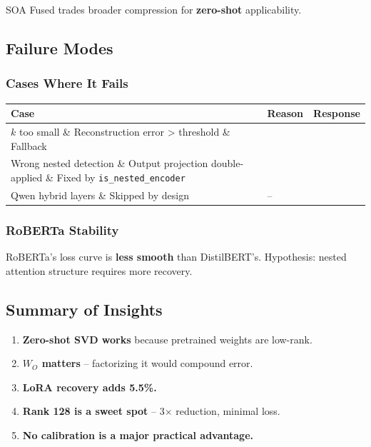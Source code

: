 SOA Fused trades broader compression for \textbf{zero-shot} applicability.

\subsection{Failure Modes}

\subsubsection{Cases Where It Fails}

\begin{table}[H]
\centering
\small
\begin{tabular}{lll}
\toprule
\textbf{Case} & \textbf{Reason} & \textbf{Response} \\
\midrule
$k$ too small \& Reconstruction error > threshold \& Fallback \\
Wrong nested detection \& Output projection double-applied \& Fixed by \texttt{is\_nested\_encoder} \\
Qwen hybrid layers \& Skipped by design & -- \\
\bottomrule
\end{tabular}
\end{table}

\subsubsection{RoBERTa Stability}

RoBERTa's loss curve is \textbf{less smooth} than DistilBERT's. Hypothesis: 
nested attention structure requires more recovery.

\subsection{Summary of Insights}

\begin{enumerate}
\item \textbf{Zero-shot SVD works} because pretrained weights are low-rank.
\item \textbf{$W_O$ matters} -- factorizing it would compound error.
\item \textbf{LoRA recovery adds 5.5\%.}
\item \textbf{Rank 128 is a sweet spot} -- 3$\times$ reduction, minimal loss.
\item \textbf{No calibration is a major practical advantage.}

\end{enumerate}


